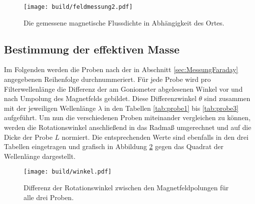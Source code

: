 \begin{figure}
  \centering
  \texttt{[image: build/feldmessung2.pdf]}
  \caption{Die gemessene magnetische Flussdichte in Abhängigkeit des Ortes.}
  \label{fig:flussmessung}
\end{figure}
\FloatBarrier


\subsection{Bestimmung der effektiven Masse}
\label{sec:AuswMasse}

Im Folgenden werden die Proben nach der in Abschnitt \ref{sec:MessungFaraday}
angegebenen Reihenfolge durchnummeriert.
Für jede Probe wird pro Filterwellenlänge die Differenz der am Goniometer
abgelesenen Winkel vor und nach Umpolung des Magnetfelds gebildet.
Diese Differenzwinkel $\theta$ sind zusammen mit der jeweiligen Wellenlänge
$\lambda$ in den Tabellen \ref{tab:probe1} bis \ref{tab:probe3}
aufgeführt.
Um nun die verschiedenen Proben miteinander vergleichen zu können,
werden die Rotationswinkel anschließend in das Radmaß umgerechnet und
auf die Dicke der Probe $L$ normiert.
Die entsprechenden Werte sind ebenfalls in den drei Tabellen
eingetragen und grafisch in Abbildung \ref{fig:winkel}
gegen das Quadrat der Wellenlänge dargestellt.




\begin{figure}
  \centering
  \texttt{[image: build/winkel.pdf]}
  \caption{Differenz der Rotationswinkel zwischen den Magnetfeldpolungen für
  alle drei Proben.}
  \label{fig:winkel}
\end{figure}
\FloatBarrier

